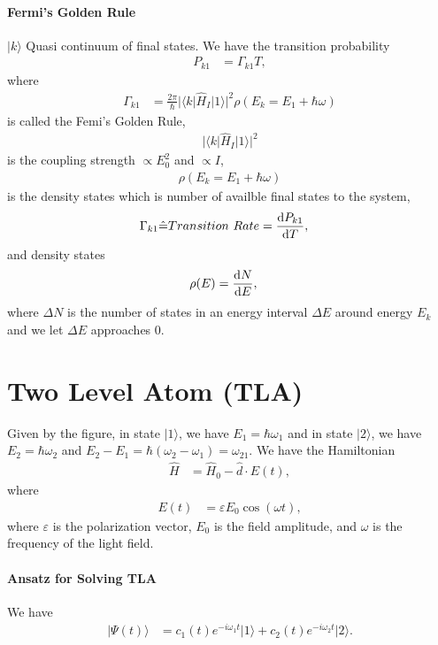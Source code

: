 \documentclass[../../note.tex]{subfiles}
\begin{document}
\paragraph{Fermi's Golden Rule}
$\vert k \rangle$ Quasi continuum of final states. We have the transition probability
\begin{align}
    P_{k1} 
    &= \Gamma_{k1} T,
\end{align}
where
\begin{align}
    \Gamma_{k1}
    &= \frac{2 \pi}{ \hbar} \vert \langle k \vert \hat{H}_I \vert 1 \rangle \vert^2 \rho(E_k = E_1 + \hbar \omega) 
\end{align}
is called the Femi's Golden Rule,
\begin{align}
    \vert \langle k \vert \hat{H}_I \vert 1 \rangle \vert^2
\end{align}
is the coupling strength $\propto E_0^2$ and $\propto I$,
\begin{align}
    \rho(E_k = E_1 + \hbar \omega) 
\end{align}
is the density states which is number of availble final states to the system,
\begin{align}
    \Gamma_{k1}
    &\hat{=} Transition~Rate=\frac{{\rm d}P_{k1}}{{\rm d}T},
\end{align}
and density states
\begin{align}
    \rho(E)
    &= \frac{{\rm d}N}{{\rm d}E},
\end{align}
where $\Delta N$ is the number of states in an energy interval $\Delta E$ around energy $E_k$ and we let $\Delta E$ approaches 0.

\section{Two Level Atom (TLA)}
Given by the figure, in state $\vert 1 \rangle$, we have $E_1 = \hbar \omega_1$ and in state $\vert 2 \rangle$, we have $E_2 = \hbar \omega_2$ and $E_2 - E_1 = \hbar(\omega_2 - \omega_1) = \omega_{21}$. We have the Hamiltonian
\begin{align}
    \hat{H}
    &= \hat{H}_0 - \hat{d} \cdot E(t),
\end{align}
where 
\begin{align}
    E(t)
    &= \varepsilon E_0 \cos(\omega t),
\end{align}
where $\varepsilon$ is the polarization vector, $E_0$ is the field amplitude, and $\omega$ is the frequency of the light field.

\paragraph{Ansatz for Solving TLA}
We have
\begin{align}
    \vert \Psi(t) \rangle
    &= c_1(t) e^{-i \omega_1 t} \vert 1 \rangle +  c_2(t) e^{-i \omega_2 t} \vert 2 \rangle.
\end{align}
\end{document}
